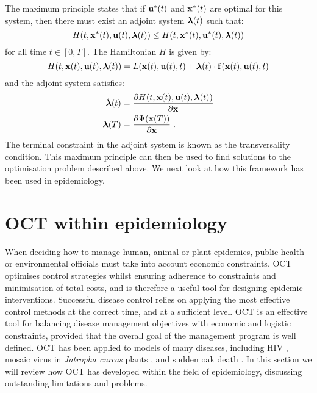 The maximum principle states that if $\mathbf{\bm{u}}^*(t)$ and $\mathbf{\bm{x}}^*(t)$ are optimal for this system, then there must exist an adjoint system $\mathbf{\bm{\lambda}}(t)$ such that:
\begin{equation}
    H(t, \mathbf{\bm{x}}^*(t), \mathbf{\bm{u}}(t), \mathbf{\bm{\lambda}}(t)) \leq H(t, \mathbf{\bm{x}}^*(t), \mathbf{\bm{u}}^*(t), \mathbf{\bm{\lambda}}(t))
\end{equation}
for all time $t \in \left[0, T\right]$. The Hamiltonian $H$ is given by:
\begin{equation}\label{eqn:ch2:hamiltonian_general}
    H(t, \mathbf{\bm{x}}(t), \mathbf{\bm{u}}(t), \mathbf{\bm{\lambda}}(t)) = L(\mathbf{\bm{x}}(t), \mathbf{\bm{u}}(t), t) + \mathbf{\bm{\lambda}}(t)\cdot\mathbf{\bm{f}}(\mathbf{\bm{x}}(t), \mathbf{\bm{u}}(t), t)
\end{equation}
and the adjoint system satisfies:
\begin{subequations}\label{eqn:ch2:adjoint_system}
    \begin{align}
        \dot{\mathbf{\bm{\lambda}}}(t) &= \frac{\partial H(t, \mathbf{\bm{x}}(t), \mathbf{\bm{u}}(t), \mathbf{\bm{\lambda}}(t))}{\partial \mathbf{\bm{x}}} \label{eqn:ch2:adjoint_system_a}\\
        \mathbf{\bm{\lambda}}(T) &= \frac{\partial \Psi(\mathbf{\bm{x}}(T))}{\partial \mathbf{\bm{x}}}\;. \label{eqn:ch2:adjoint_system_b}
    \end{align}
\end{subequations}
The terminal constraint in the adjoint system is known as the transversality condition. This maximum principle can then be used to find solutions to the optimisation problem described above. We next look at how this framework has been used in epidemiology.

\section{OCT within epidemiology}\label{sec:ch2:oct_in_epidem}

When deciding how to manage human, animal or plant epidemics, public health or environmental officials must take into account economic constraints. OCT optimises control strategies whilst ensuring adherence to constraints and minimisation of total costs, and is therefore a useful tool for designing epidemic interventions. Successful disease control relies on applying the most effective control methods at the correct time, and at a sufficient level. OCT is an effective tool for balancing disease management objectives with economic and logistic constraints, provided that the overall goal of the management program is well defined. OCT has been applied to models of many diseases, including HIV \citep{kirschner_optimal_1997}, mosaic virus in \emph{Jatropha curcas} plants \citep{al_basir_impact_2017}, and sudden oak death \citep{ndeffo_mbah_optimization_2010}. In this section we will review how OCT has developed within the field of epidemiology, discussing outstanding limitations and problems.

